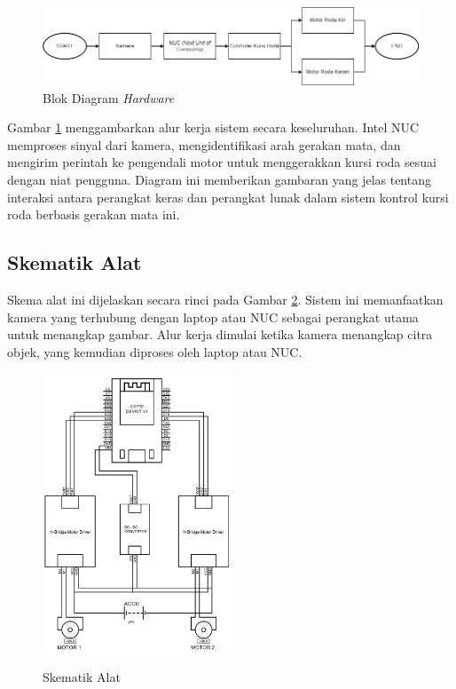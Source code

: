 \begin{figure} [ht] \centering
  \includegraphics[scale=0.5]{gambar/bab3/hardware.png}
  \caption{Blok Diagram \textit{Hardware}}
  \label{fig:hardware}
\end{figure}

Gambar \ref{fig:hardware} menggambarkan alur kerja sistem secara keseluruhan. Intel NUC memproses sinyal dari kamera, mengidentifikasi arah gerakan mata, dan mengirim perintah ke pengendali motor untuk menggerakkan kursi roda sesuai dengan niat pengguna. Diagram ini memberikan gambaran yang jelas tentang interaksi antara perangkat keras dan perangkat lunak dalam sistem kontrol kursi roda berbasis gerakan mata ini.

\subsection{Skematik Alat}
\label{sec:skematik}

Skema alat ini dijelaskan secara rinci pada Gambar \ref{fig:Skematik Alat}. Sistem ini memanfaatkan kamera yang terhubung dengan laptop atau NUC sebagai perangkat utama untuk menangkap gambar. Alur kerja dimulai ketika kamera menangkap citra objek, yang kemudian diproses oleh laptop atau NUC. 

\begin{figure} [H] \centering
  \includegraphics[width=0.5\textwidth]{gambar/bab3/Schematics.png}
  \caption{Skematik Alat}
  \label{fig:Skematik Alat}
  \parencite{ekatama2024perancangan}
\end{figure}

